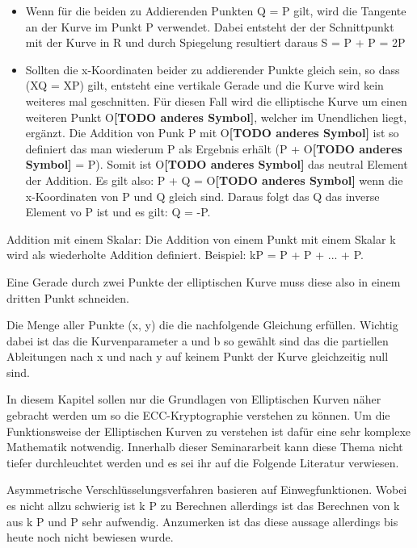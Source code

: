 		\begin{itemize}
			\item Wenn für die beiden zu Addierenden Punkten Q = P gilt, wird die Tangente an der Kurve im Punkt P verwendet. Dabei entsteht der der Schnittpunkt mit der Kurve in R und durch Spiegelung resultiert daraus S = P + P = 2P
			\item Sollten die x-Koordinaten beider zu addierender Punkte gleich sein, so dass (XQ = XP) gilt, entsteht eine vertikale Gerade und die Kurve wird kein weiteres mal geschnitten. Für diesen Fall wird die elliptische Kurve um einen weiteren Punkt O\textbf{[TODO anderes Symbol]}, welcher im Unendlichen liegt, ergänzt. Die Addition von Punk P mit O\textbf{[TODO anderes Symbol]} ist so definiert das man wiederum P als Ergebnis erhält (P + O\textbf{[TODO anderes Symbol]} = P). Somit ist O\textbf{[TODO anderes Symbol]} das neutral Element der Addition. Es gilt also: P + Q = O\textbf{[TODO anderes Symbol]} wenn die x-Koordinaten von P und Q gleich sind. Daraus folgt das Q das inverse Element vo P ist und es gilt: Q = -P.
		\end{itemize}
		
		Addition mit einem Skalar: Die Addition von einem Punkt mit einem Skalar k  wird als wiederholte Addition definiert. Beispiel: kP = P + P + ... + P.
		
		Eine  Gerade  durch  zwei  Punkte  der 
		elliptischen Kurve muss diese also in einem dritten Punkt schneiden. \cite{Information:und:Kommunikation}		
		
		
		Die Menge aller Punkte (x, y) die die nachfolgende Gleichung erfüllen. Wichtig dabei ist das die Kurvenparameter a und b so gewählt sind das die partiellen Ableitungen nach x und nach y auf keinem Punkt der Kurve gleichzeitig null sind.\cite{Information:und:Kommunikation}
		
		
		
		
		In diesem Kapitel sollen nur die Grundlagen von Elliptischen Kurven näher gebracht werden um so die ECC-Kryptographie verstehen zu können. Um die Funktionsweise der Elliptischen Kurven zu verstehen ist dafür eine sehr komplexe Mathematik notwendig. Innerhalb dieser Seminararbeit kann diese Thema nicht tiefer durchleuchtet werden und es sei ihr auf die Folgende Literatur verwiesen. 
		
		
		
		Asymmetrische Verschlüsselungsverfahren basieren auf Einwegfunktionen. Wobei es nicht allzu schwierig ist k \mycdot P zu Berechnen allerdings ist das Berechnen von k aus k \mycdot P und P sehr aufwendig. Anzumerken ist das diese aussage allerdings bis heute noch nicht bewiesen wurde.
		
